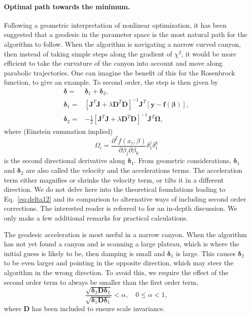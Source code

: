 \documentclass{article}
\begin{document}
\paragraph{Optimal path towards the minimum.} Following a geometric interpretation of nonlinear optimization, it has been suggested that a geodesic in the parameter space is the most natural path for the algorithm to follow. When the algorithm is navigating a narrow curved canyon, then instead of taking simple steps along the gradient of $\chi^2$, it would be more efficient to take the curvature of the canyon into account and move along parabolic trajectories. One can imagine the benefit of this for the Rosenbrock function, to give an example. To second order, the step is then given by
\begin{equation}
  \label{eq:delta12}
  \begin{split}
    \bm\delta =& \bm\delta_1 + \bm\delta_2, \\
    \bm\delta_1 =& \left[ \bm J^T \bm J + \lambda\bm D^T\bm D
    \right]^{-1} \bm J^T \left[ \bm y - \bm f(\bm\beta) \right], \\
    \bm\delta_2 =& -\frac{1}{2} \left[ \bm J^T \bm J + \lambda\bm
      D^T\bm D\right]^{-1} \bm J^T \bm\Omega,
  \end{split}
\end{equation}
where (Einstein summation implied)
\begin{equation}
  \label{eq:omega}
  \Omega_i = \frac{\partial^2
    f(x_i,\beta)}{\partial\beta_j \partial\beta_k} \delta_1^j
  \delta_1^k
\end{equation}
is the second directional derivative along $\bm\delta_1$. From geometric considerations, $\bm\delta_1$ and $\bm\delta_2$ are also called the velocity and the accelerations terms. The acceleration term either magnifies or shrinks the velocity term, or tilts it in a different direction. We do not delve here into the theoretical foundations leading to Eq.~\eqref{eq:delta12} and its comparison to alternative ways of including second order corrections. The interested reader is referred to \cite{transtrum10, transtrum11, transtrum12} for an in-depth discussion. We only make a few additional remarks for practical calculations.

The geodesic acceleration is most useful in a narrow canyon. When the algorithm has not yet found a canyon and is scanning a large plateau, which is where the initial guess is likely to be, then damping is small and $\bm\delta_1$ is large. This causes $\bm\delta_2$ to be even larger and pointing in the opposite direction, which may steer the algorithm in the wrong direction. To avoid this, we require the effect of the second order term to always be smaller than the first order term,
\begin{equation}
  \label{eq:acc_alpha}
  \frac{\sqrt{\bm\delta_2\bm D\bm\delta_2}}{\sqrt{\bm\delta_1\bm
      D\bm\delta_1}} < \alpha, \quad 0 \le \alpha < 1,
\end{equation}
where $\bm D$ has been included to ensure scale invariance.
\end{document}
